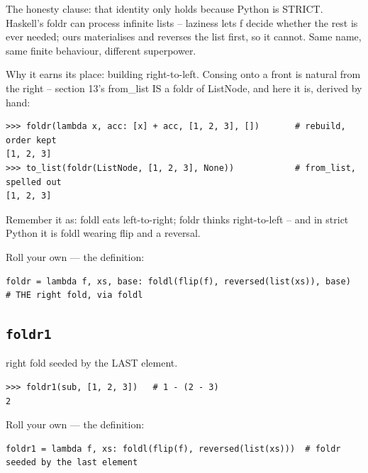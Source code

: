 \documentclass[10pt,letterpaper]{book}
\begin{document}
The honesty clause: that identity only holds because Python is STRICT. Haskell's foldr can process infinite lists -- laziness lets f decide whether the rest is ever needed; ours materialises and reverses the list first, so it cannot. Same name, same finite behaviour, different superpower.


Why it earns its place: building right-to-left. Consing onto a front is natural from the right -- section 13's from\_list IS a foldr of ListNode, and here it is, derived by hand:

\begin{lstlisting}[style=ex]
>>> foldr(lambda x, acc: [x] + acc, [1, 2, 3], [])       # rebuild, order kept
[1, 2, 3]
>>> to_list(foldr(ListNode, [1, 2, 3], None))            # from_list, spelled out
[1, 2, 3]
\end{lstlisting}

Remember it as: foldl eats left-to-right; foldr thinks right-to-left -- and in strict Python it is foldl wearing flip and a reversal.


Roll your own --- the definition:

\begin{lstlisting}[style=ex]
foldr = lambda f, xs, base: foldl(flip(f), reversed(list(xs)), base)  # THE right fold, via foldl
\end{lstlisting}

\subsection{\texttt{foldr1}}\label{def:foldr1}
right fold seeded by the LAST element.
\begin{lstlisting}[style=ex]
>>> foldr1(sub, [1, 2, 3])   # 1 - (2 - 3)
2
\end{lstlisting}

Roll your own --- the definition:

\begin{lstlisting}[style=ex]
foldr1 = lambda f, xs: foldl(flip(f), reversed(list(xs)))  # foldr seeded by the last element
\end{lstlisting}
\end{document}
